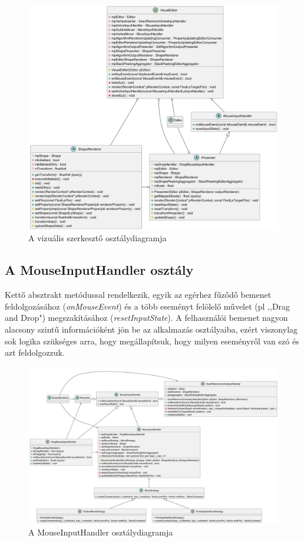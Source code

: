 \begin{figure}[H]
	\centering
	\includegraphics[width=1\linewidth]{images/class_visual_editor.png}
	\caption{A vizuális szerkesztő osztálydiagramja}
	\label{fig:class_visual_editor-1}
\end{figure}


\subsection{A MouseInputHandler osztály}

Kettő absztrakt metódussal rendelkezik, egyik az egérhez fűződő bemenet feldolgozásához (\textit{onMouseEvent}) és a több eseményt felölelő művelet (pl ,,Drag and Drop") megszakításához (\textit{resetInputState}). A felhasználói bemenet nagyon alacsony szintű információként jön be az alkalmazás osztályaiba, ezért viszonylag sok logika szükséges arra, hogy megállapítsuk, hogy milyen eseményről van szó és azt feldolgozzuk.

\begin{figure}[H]
	\centering
	\includegraphics[width=1\linewidth]{images/class_mouse_input_handler.png}
	\caption{A MouseInputHandler osztálydiagramja}
	\label{fig:class_mouse_input_handler-1}
\end{figure}

